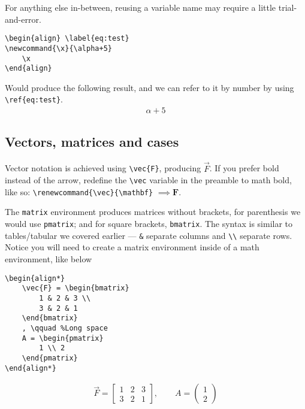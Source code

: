 For anything else in-between, reusing a variable name may require a little trial-and-error.

\begin{lstlisting}
\begin{align} \label{eq:test}
\newcommand{\x}{\alpha+5}
    \x
\end{align}
\end{lstlisting}
Would produce the following result, and we can refer to it by number by using \verb|\ref{eq:test}|.
\begin{align}
    \alpha+5
\end{align}
\subsection{Vectors, matrices and cases}
Vector notation is achieved using \verb|\vec{F}|, producing \(\vec{F}\).
If you prefer bold instead of the arrow, redefine the \verb|\vec| variable in the preamble to math bold, like so:
\verb|\renewcommand{\vec}{\mathbf}| \(\implies \mathbf{F}\).

The \verb|matrix| environment produces matrices without brackets,
for parenthesis we would use \texttt{pmatrix}; and for square brackets, \texttt{bmatrix}.
The syntax is similar to tables/tabular we covered earlier --- \verb|&| separate columns and \verb|\\| separate rows.
Notice you will need to create a matrix environment inside of a math environment, like below 

\begin{lstlisting}
\begin{align*}
    \vec{F} = \begin{bmatrix}
        1 & 2 & 3 \\
        3 & 2 & 1 
    \end{bmatrix}
    , \qquad %Long space
    A = \begin{pmatrix}
        1 \\ 2
    \end{pmatrix} 
\end{align*}
\end{lstlisting}

\begin{align*}
    \vec{F} = \begin{bmatrix}
        1 & 2 & 3 \\
        3 & 2 & 1 
    \end{bmatrix}
    , \qquad
    A = \begin{pmatrix}
        1 \\ 2
\end{pmatrix}
\end{align*}

